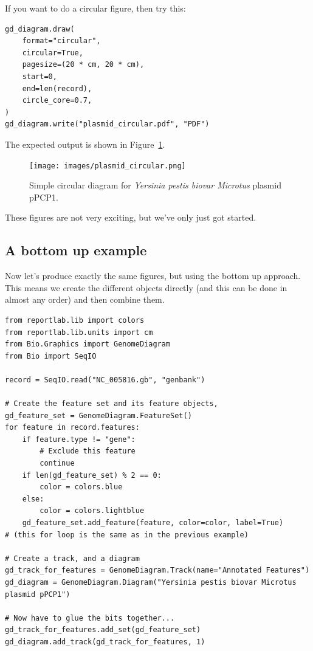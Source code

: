 If you want to do a circular figure, then try this:

\begin{verbatim}
gd_diagram.draw(
    format="circular",
    circular=True,
    pagesize=(20 * cm, 20 * cm),
    start=0,
    end=len(record),
    circle_core=0.7,
)
gd_diagram.write("plasmid_circular.pdf", "PDF")
\end{verbatim}

\begin{htmlonly}

\end{htmlonly}
\begin{latexonly}
The expected output is shown in Figure~\ref{fig:plasmid_circular}.
\begin{figure}[htbp]
\centering
\texttt{[image: images/plasmid\_circular.png]}
\caption{Simple circular diagram for \textit{Yersinia pestis biovar Microtus} plasmid pPCP1.}
\label{fig:plasmid_circular}
\end{figure}
\end{latexonly}
These figures are not very exciting, but we've only just got started.

\subsection{A bottom up example}
Now let's produce exactly the same figures, but using the bottom up approach.
This means we create the different objects directly (and this can be done in
almost any order) and then combine them.

\begin{verbatim}
from reportlab.lib import colors
from reportlab.lib.units import cm
from Bio.Graphics import GenomeDiagram
from Bio import SeqIO

record = SeqIO.read("NC_005816.gb", "genbank")

# Create the feature set and its feature objects,
gd_feature_set = GenomeDiagram.FeatureSet()
for feature in record.features:
    if feature.type != "gene":
        # Exclude this feature
        continue
    if len(gd_feature_set) % 2 == 0:
        color = colors.blue
    else:
        color = colors.lightblue
    gd_feature_set.add_feature(feature, color=color, label=True)
# (this for loop is the same as in the previous example)

# Create a track, and a diagram
gd_track_for_features = GenomeDiagram.Track(name="Annotated Features")
gd_diagram = GenomeDiagram.Diagram("Yersinia pestis biovar Microtus plasmid pPCP1")

# Now have to glue the bits together...
gd_track_for_features.add_set(gd_feature_set)
gd_diagram.add_track(gd_track_for_features, 1)
\end{verbatim}

